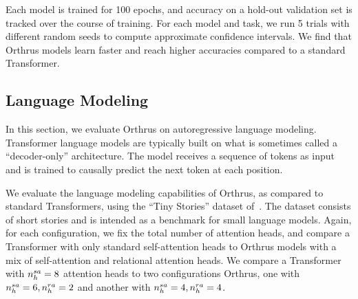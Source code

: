 Each model is trained for 100 epochs, and accuracy on a hold-out validation set is tracked over the course of training. For each model and task, we run 5 trials with different random seeds to compute approximate confidence intervals. We find that Orthrus models learn faster and reach higher accuracies compared to a standard Transformer.


\subsection{Language Modeling}\label{ssec:tiny_stories}

In this section, we evaluate Orthrus on autoregressive language modeling. Transformer language models are typically built on what is sometimes called a ``decoder-only'' architecture. The model receives a sequence of tokens as input and is trained to causally predict the next token at each position.

We evaluate the language modeling capabilities of Orthrus, as compared to standard Transformers, using the ``Tiny Stories'' dataset of~\citet{eldanTinyStoriesHowSmall2023}. The dataset consists of short stories and is intended as a benchmark for small language models. Again, for each configuration, we fix the total number of attention heads, and compare a Transformer with only standard self-attention heads to Orthrus models with a mix of self-attention and relational attention heads. We compare a Transformer with $n_h^{sa} = 8$ attention heads to two configurations Orthrus, one with $n_h^{sa} = 6, n_h^{ra} = 2$ and another with $n_h^{sa} = 4, n_h^{ra} = 4$.


